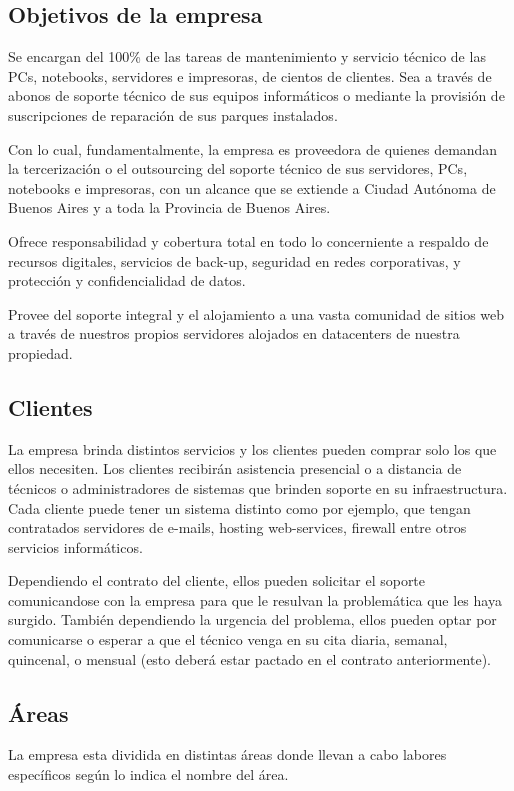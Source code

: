 \documentclass[12pt,a4paper]{article}
\begin{document}
\subsection{Objetivos de la empresa}
Se encargan del 100\% de las tareas de mantenimiento y servicio técnico de las PCs, notebooks, servidores e impresoras, de cientos de clientes. Sea a través de abonos de soporte técnico de sus equipos informáticos o mediante la provisión de suscripciones de reparación de sus parques instalados.

Con lo cual, fundamentalmente, la empresa es proveedora de quienes demandan la tercerización o el outsourcing del soporte técnico de sus servidores, PCs, notebooks e impresoras, con un alcance que se extiende a Ciudad Autónoma de Buenos Aires y a toda la Provincia de Buenos Aires.

Ofrece responsabilidad y cobertura total en todo lo concerniente a respaldo de recursos digitales, servicios de back-up, seguridad en redes corporativas, y protección y confidencialidad de datos.

Provee del soporte integral y el alojamiento a una vasta comunidad de sitios web a través de nuestros propios servidores alojados en datacenters de nuestra propiedad.

\subsection{Clientes}
La empresa brinda distintos servicios y los clientes pueden comprar solo los que ellos necesiten. Los clientes recibirán asistencia presencial o a distancia de técnicos o administradores de sistemas que brinden soporte en su infraestructura. Cada cliente puede tener un sistema distinto como por ejemplo, que tengan contratados servidores de e-mails, hosting web-services, firewall entre otros servicios informáticos.

Dependiendo el contrato del cliente, ellos pueden solicitar el soporte comunicandose con la empresa para que le resulvan la problemática que les haya surgido. También dependiendo la urgencia del problema, ellos pueden optar por comunicarse o esperar a que el técnico venga en su cita diaria, semanal, quincenal, o mensual (esto deberá estar pactado en el contrato anteriormente).

\subsection{Áreas}
La empresa esta dividida en distintas áreas donde llevan a cabo labores específicos según lo indica el nombre del área.
\end{document}
